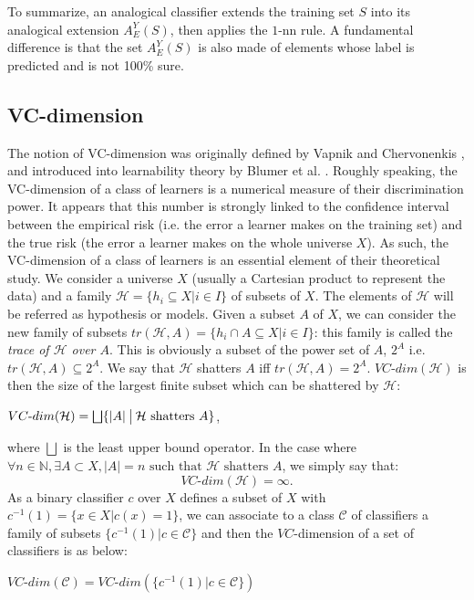 To summarize, an analogical classifier extends the training set $S$ into its
analogical extension $A_E^Y(S)$, then applies the $1\mbox{-nn}$ rule. A
fundamental difference is that the set $A_E^Y(S)$ is also made of elements
whose label is predicted and is not 100\% sure.

\subsection{VC-dimension}\label{vcdim}
The notion of VC-dimension was originally defined by Vapnik and Chervonenkis
\cite{Vap98}, and introduced into learnability theory by Blumer et al.
\cite{BluEhrHauWarACM89}. Roughly speaking, the VC-dimension of a class of learners is a numerical measure of their discrimination power. It appears that this number is strongly linked to the confidence interval between the empirical risk (i.e. the error a learner makes on the training set) and the true risk (the error a learner makes on the whole universe $X$). As such, the VC-dimension of a class of learners is an essential element of their theoretical study.
We consider a universe $X$ (usually a Cartesian product to represent the data) and a
family $\mathcal{H}=\{h_i \subseteq X|i \in I\}$ of subsets of $X$.
The elements of $\mathcal{H}$ will be referred as hypothesis or models.
Given a subset $A$
of $X$, we can consider the new family of subsets $tr(\mathcal{H},A) = \{h_i \cap A \subseteq X|i \in I\}$: this family is called the {\it trace of $\mathcal{H}$ over $A$}. This is obviously a subset
of the power set of $A$, $2^A$ i.e. $tr(\mathcal{H},A) \subseteq 2^A$.
We say that $\mathcal{H}$ shatters $A$ iff $tr(\mathcal{H},A)=2^A$.
$VC\mbox{-}dim(\mathcal{H})$ is then the size of the largest finite subset which can be shattered by $\mathcal{H}$:
\begin{definition}
  $VC\mbox{-}dim(\mathcal{H}) = \bigsqcup \{|A| \given[\big] \mathcal{H} \mbox{ shatters } A
\}$,
\end{definition}
where $\bigsqcup$ is the least upper bound operator.
In the case where $\forall n \in\mathbb{N}, \exists  A \subset X, |A|=n \mbox{ such
that } \mathcal{H} \mbox{ shatters } A$, we simply say that:
$$VC\mbox{-}dim(\mathcal{H})=\infty.$$
\noindent
As a binary classifier $c$ over $X$ defines a subset of $X$ with $c^{-1}(1)=\{x \in X | c(x)=1\}$, we can associate to a class $\mathcal{C}$ of classifiers a family of subsets
$\{c^{-1}(1) | c \in \mathcal{C}\}$ and then the $VC\mbox{-}$dimension of a set of classifiers is as below:
\begin{definition}
$VC\mbox{-}dim(\mathcal{C})=VC\mbox{-}dim(\{c^{-1}(1) | c \in \mathcal{C}\})$
\end{definition}
